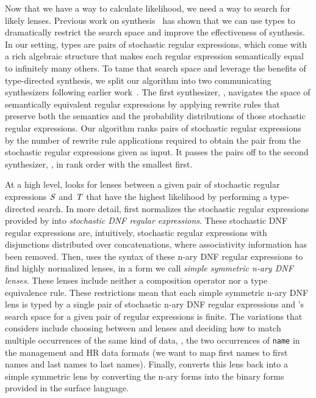 \documentclass[acmsmall,screen,anonymous]{acmart}
\begin{document}
Now that we have a way to calculate likelihood, we need a way to search for
likely lenses. Previous work on synthesis~\cite{?,?,?} has shown that we can use
types to dramatically restrict the search space and improve the effectiveness of
synthesis. In our setting, types are pairs of stochastic regular expressions,
which come with a rich algebraic structure that makes each regular expression
semantically equal to infinitely many others. To tame that search space and
leverage the benefits of type-directed synthesis, we split our algorithm into
two communicating synthesizers following earlier
work~\cite{quotient-lens-synthesis}. The first synthesizer, \Expand, navigates
the space of semantically equivalent regular expressions by applying rewrite
rules that preserve both the semantics and the probability distributions of
those stochastic regular expressions. Our algorithm ranks pairs of stochastic
regular expressions by the number of rewrite rule applications required to
obtain the pair from the stochastic regular expressions given as input. It
passes the pairs off to the second synthesizer, \GreedySynth, in rank order with
the smallest first.

At a high level, \GreedySynth looks for lenses between a given pair of
stochastic regular expressions $\mathit{S}$ and $\mathit{T}$ that have the highest
likelihood by performing a type-directed search. In more detail, \GreedySynth
first normalizes the stochastic regular expressions provided by \Expand into
\emph{stochastic DNF regular expressions}. These stochastic DNF regular
expressions are, intuitively, stochastic regular expressions with disjunctions
distributed over concatenations, where associativity information has been
removed. Then, \GreedySynth uses the syntax of these n-ary DNF regular
expressions to find highly normalized lenses, in a form we call \emph{simple
  symmetric n-ary DNF lenses}. These lenses include neither a composition
operator nor a type equivalence rule. These restrictions mean that each simple
symmetric n-ary DNF lens is typed by a single pair of stochastic n-ary DNF
regular expressions and \GreedySynth's search space for a given pair of regular
expressions is finite. The variations that \GreedySynth considers include
choosing between \IdentityLens{} and \Disconnect lenses and deciding how to
match multiple occurrences of the same kind of data, \EG, the two occurrences of
\lstinline{name} in the management and HR data formats (we want to map first
names to first names and last names to last names). Finally, \GreedySynth
converts this lens back into a simple symmetric lens by converting the n-ary
forms into the binary forms provided in the surface language.
\end{document}

